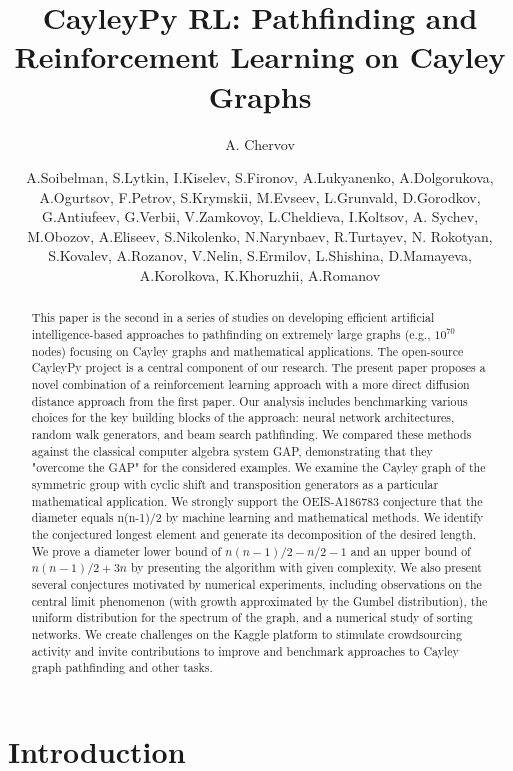 \documentclass[reqno,11pt]{amsart}
\title[CayleyPy RL]{CayleyPy RL: Pathfinding and Reinforcement Learning on Cayley Graphs}
\author[A. Chervov]{A. Chervov}
\author[A.Soibelman, ... ]{
A.Soibelman, S.Lytkin, I.Kiselev, S.Fironov, A.Lukyanenko, A.Dolgorukova, A.Ogurtsov,
F.Petrov, S.Krymskii, M.Evseev, L.Grunvald, D.Gorodkov, G.Antiufeev, G.Verbii, 
V.Zamkovoy, L.Cheldieva, I.Koltsov, A. Sychev, M.Obozov, 
A.Eliseev, S.Nikolenko, N.Narynbaev, R.Turtayev,
N. Rokotyan, S.Kovalev,
A.Rozanov, V.Nelin, S.Ermilov,
 L.Shishina, D.Mamayeva, A.Korolkova,
K.Khoruzhii, A.Romanov }
\begin{document}
 

\begin{abstract}
This paper is the second in a series of studies on developing efficient artificial intelligence-based approaches to pathfinding on extremely large graphs (e.g., $10^{70}$ nodes) focusing on Cayley graphs and mathematical applications. The open-source CayleyPy project is a central component of our research. The present paper proposes a novel combination of a reinforcement learning approach with a more direct diffusion distance approach from the first paper. Our analysis includes benchmarking various choices for the key building blocks of the approach: neural network architectures, random walk generators, and beam search pathfinding. We compared these methods against the classical computer algebra system GAP, demonstrating that they "overcome the GAP" for the considered examples.
We examine the Cayley graph of the symmetric group with cyclic shift and transposition generators as a particular mathematical application. We strongly support the OEIS-A186783 conjecture that the diameter equals n(n-1)/2 by machine learning and mathematical methods. We identify the conjectured longest element and generate its decomposition of the desired length. We prove a diameter lower bound of $n(n-1)/2-n/2-1$ and an upper bound of $n(n-1)/2+3n$ by presenting the algorithm with given complexity. We also present several conjectures motivated by numerical experiments, including observations on the central limit phenomenon (with growth approximated by the Gumbel distribution), the uniform distribution for the spectrum of the graph, and a numerical study of sorting networks.
We create challenges on the Kaggle platform to stimulate crowdsourcing activity and invite contributions to improve and benchmark approaches to Cayley graph pathfinding and other tasks.
\end{abstract}




\maketitle 

\setcounter{tocdepth}{1}
\small
\tableofcontents
\normalsize

\section{Introduction}
\end{document}
